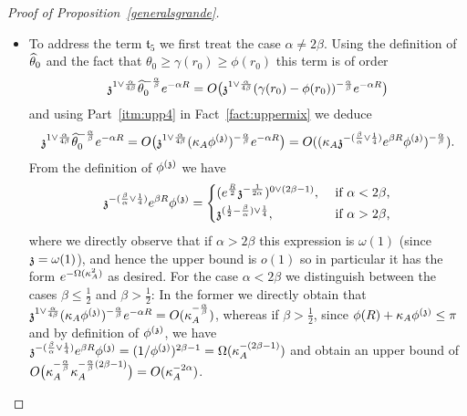 \begin{proof}[Proof of Proposition~\ref{generalsgrande}]
\begin{itemize}
    \item To address the term $\mathfrak{t}_5$ we first treat the case $\alpha\neq2\beta$. Using the definition of $\hatt$ and the fact that $\theta_0\geq\gamma(r_0)\ge \phi(r_0)$ this term is of order 
    \[\ss^{1\vee\frac{\alpha}{4\beta}}\hatt^{-\frac{\alpha}{\beta}}e^{-\alpha R}=O\big(\ss^{1\vee\frac{\alpha}{4\beta}}(\gamma(r_0)-\phi(r_0))^{-\frac{\alpha}{\beta}}e^{-\alpha R}\big)\]
    and using Part~\eqref{itm:upp4} in Fact~\ref{fact:uppermix} we deduce%
    \begin{equation}\label{eq:boundforlater}\ss^{1\vee\frac{\alpha}{4\beta}}\hatt^{-\frac{\alpha}{\beta}}e^{-\alpha R}=O\big(\ss^{1\vee\frac{\alpha}{4\beta}}(\KA\phis)^{-\frac{\alpha}{\beta}}e^{-\alpha R}\big)=O((\KA\ss^{-(\frac{\beta}{\alpha}\vee\frac14)}e^{\beta R}\phis)^{-\frac{\alpha}{\beta}}).\end{equation}    From the definition of $\phis$ we have
    \[
\ss^{-(\frac{\beta}{\alpha}\vee\frac{1}{4})}e^{\beta R}\phis =
\begin{cases}
(e^{\frac{R}{2} }\ss^{-\frac{1}{2\alpha}})^{0\vee (2\beta-1)},
& \text{ if $\alpha<2\beta$,}\\[2pt]
\ss^{(\frac12-\frac{\beta}{\alpha})\vee\frac{1}{4}},
& \text{ if $\alpha>2\beta$,}
\end{cases}
\]
where we directly observe that if $\alpha>2\beta$ this expression is $\omega(1)$ (since $\ss=\omega(1)$), and hence the upper bound is $o(1)$ so in particular it has the form $e^{-\Omega(\KA^2)}$ as desired. For the case $\alpha<2\beta$ we distinguish between the cases $\beta\leq\frac{1}{2}$ and $\beta>\frac{1}{2}$: In the former we directly obtain that $\ss^{1\vee\frac{\alpha}{4\beta}}(\KA\phis)^{-\frac{\alpha}{\beta}}e^{-\alpha R}=O(\KA^{-\frac{\alpha}{\beta}})$, whereas if $\beta>\frac12$, since $\phi(R)+\KA\phis\leq\pi$ and by definition of $\phis$, we have
$\ss^{-(\frac{\beta}{\alpha}\vee\frac14)}e^{\beta R}\phis=(1/\phis)^{2\beta-1}=\Omega(\KA^{-(2\beta-1)})$ and obtain an upper bound of $O\big(\KA^{-\frac{\alpha}{\beta}}\KA^{-\frac{\alpha}{\beta}(2\beta-1)}\big)=O(\KA^{-2\alpha})$. 


\end{itemize}
\end{proof}
